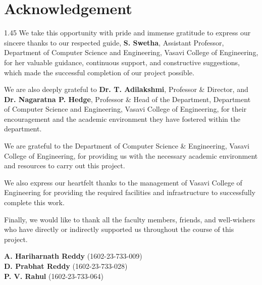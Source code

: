 \documentclass[12pt,a4paper]{report}
\begin{document}
\clearpage

\chapter*{Acknowledgement}

\begin{spacing}{1.45}
\noindent We take this opportunity with pride and immense gratitude to express our sincere thanks to our respected guide, \textbf{S. Swetha}, Assistant Professor, Department of Computer Science and Engineering, Vasavi College of Engineering, for her valuable guidance, continuous support, and constructive suggestions, which made the successful completion of our project possible.

\vspace{0.4cm}
\noindent We are also deeply grateful to \textbf{Dr. T. Adilakshmi}, Professor \& Director, and \textbf{Dr. Nagaratna P. Hedge}, Professor \& Head of the Department, Department of Computer Science and Engineering, Vasavi College of Engineering, for their encouragement and the academic environment they have fostered within the department.

\vspace{0.4cm}
\noindent We are grateful to the Department of Computer Science \& Engineering, Vasavi College of Engineering, for providing us with the necessary academic environment and resources to carry out this project.

\vspace{0.4cm}
\noindent We also express our heartfelt thanks to the management of Vasavi College of Engineering for providing the required facilities and infrastructure to successfully complete this work.

\vspace{0.4cm}
\noindent Finally, we would like to thank all the faculty members, friends, and well-wishers who have directly or indirectly supported us throughout the course of this project.
\end{spacing}

\vspace{2.0cm}
\noindent
\begin{flushright}
\textbf{A. Hariharnath Reddy} (1602-23-733-009)\\[4pt]
\textbf{D. Prabhat Reddy} (1602-23-733-028)\\[4pt]
\textbf{P. V. Rahul} (1602-23-733-064)
\end{flushright}
\end{document}
